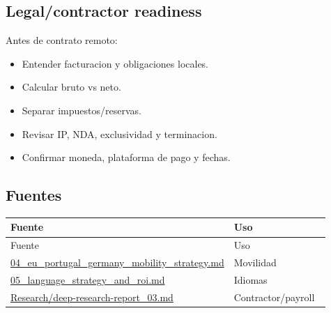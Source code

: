 \subsection{Legal/contractor readiness}


Antes de contrato remoto:


\begin{itemize}
\item Entender facturacion y obligaciones locales.
\item Calcular bruto vs neto.
\item Separar impuestos/reservas.
\item Revisar IP, NDA, exclusividad y terminacion.
\item Confirmar moneda, plataforma de pago y fechas.
\end{itemize}


\subsection{Fuentes}


\begin{center}
\scriptsize
\begin{longtable}{>{\raggedright\arraybackslash}p{0.455\linewidth} >{\raggedright\arraybackslash}p{0.455\linewidth}}
\toprule
Fuente & Uso \\
\midrule
\endfirsthead
\toprule
Fuente & Uso \\
\midrule
\endhead
\href{file:///E:/Laboral/04_eu_portugal_germany_mobility_strategy.md}{04\_eu\_portugal\_germany\_mobility\_strategy.md} & Movilidad \\
\href{file:///E:/Laboral/05_language_strategy_and_roi.md}{05\_language\_strategy\_and\_roi.md} & Idiomas \\
\href{file:///E:/Laboral/Research/deep-research-report_03.md}{Research/deep-research-report\_03.md} & Contractor/payroll \\
\bottomrule
\end{longtable}
\end{center}
